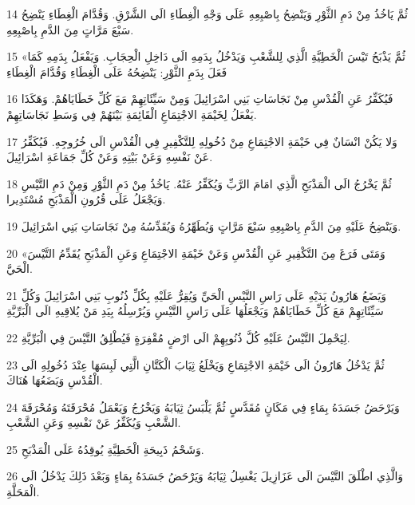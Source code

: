 \par 14 ثُمَّ يَاخُذُ مِنْ دَمِ الثَّوْرِ وَيَنْضِحُ بِاصْبِعِهِ عَلَى وَجْهِ الْغِطَاءِ الَى الشَّرْقِ. وَقُدَّامَ الْغِطَاءِ يَنْضِحُ سَبْعَ مَرَّاتٍ مِنَ الدَّمِ بِاصْبِعِهِ.
\par 15 «ثُمَّ يَذْبَحُ تَيْسَ الْخَطِيَّةِ الَّذِي لِلشَّعْبِ وَيَدْخُلُ بِدَمِهِ الَى دَاخِلِ الْحِجَابِ. وَيَفْعَلُ بِدَمِهِ كَمَا فَعَلَ بِدَمِ الثَّوْرِ: يَنْضِحُهُ عَلَى الْغِطَاءِ وَقُدَّامَ الْغِطَاءِ
\par 16 فَيُكَفِّرُ عَنِ الْقُدْسِ مِنْ نَجَاسَاتِ بَنِي اسْرَائِيلَ وَمِنْ سَيِّئَاتِهِمْ مَعَ كُلِّ خَطَايَاهُمْ. وَهَكَذَا يَفْعَلُ لِخَيْمَةِ الاجْتِمَاعِ الْقَائِمَةِ بَيْنَهُمْ فِي وَسَطِ نَجَاسَاتِهِمْ.
\par 17 وَلا يَكُنْ انْسَانٌ فِي خَيْمَةِ الاجْتِمَاعِ مِنْ دُخُولِهِ لِلتَّكْفِيرِ فِي الْقُدْسِ الَى خُرُوجِهِ. فَيُكَفِّرُ عَنْ نَفْسِهِ وَعَنْ بَيْتِهِ وَعَنْ كُلِّ جَمَاعَةِ اسْرَائِيلَ.
\par 18 ثُمَّ يَخْرُجُ الَى الْمَذْبَحِ الَّذِي امَامَ الرَّبِّ وَيُكَفِّرُ عَنْهُ. يَاخُذُ مِنْ دَمِ الثَّوْرِ وَمِنْ دَمِ التَّيْسِ وَيَجْعَلُ عَلَى قُرُونِ الْمَذْبَحِ مُسْتَدِيرا.
\par 19 وَيَنْضِحُ عَلَيْهِ مِنَ الدَّمِ بِاصْبِعِهِ سَبْعَ مَرَّاتٍ وَيُطَهِّرُهُ وَيُقَدِّسُهُ مِنْ نَجَاسَاتِ بَنِي اسْرَائِيلَ.
\par 20 «وَمَتَى فَرَغَ مِنَ التَّكْفِيرِ عَنِ الْقُدْسِ وَعَنْ خَيْمَةِ الاجْتِمَاعِ وَعَنِ الْمَذْبَحِ يُقَدِّمُ التَّيْسَ الْحَيَّ.
\par 21 وَيَضَعُ هَارُونُ يَدَيْهِ عَلَى رَاسِ التَّيْسِ الْحَيِّ وَيُقِرُّ عَلَيْهِ بِكُلِّ ذُنُوبِ بَنِي اسْرَائِيلَ وَكُلِّ سَيِّئَاتِهِمْ مَعَ كُلِّ خَطَايَاهُمْ وَيَجْعَلُهَا عَلَى رَاسِ التَّيْسِ وَيُرْسِلُهُ بِيَدِ مَنْ يُلاقِيهِ الَى الْبَرِّيَّةِ
\par 22 لِيَحْمِلَ التَّيْسُ عَلَيْهِ كُلَّ ذُنُوبِهِمْ الَى ارْضٍ مُقْفِرَةٍ فَيُطْلِقُ التَّيْسَ فِي الْبَرِّيَّةِ.
\par 23 ثُمَّ يَدْخُلُ هَارُونُ الَى خَيْمَةِ الاجْتِمَاعِ وَيَخْلَعُ ثِيَابَ الْكَتَّانِ الَّتِي لَبِسَهَا عِنْدَ دُخُولِهِ الَى الْقُدْسِ وَيَضَعُهَا هُنَاكَ.
\par 24 وَيَرْحَضُ جَسَدَهُ بِمَاءٍ فِي مَكَانٍ مُقَدَّسٍ ثُمَّ يَلْبَسُ ثِيَابَهُ وَيَخْرُجُ وَيَعْمَلُ مُحْرَقَتَهُ وَمُحْرَقَةَ الشَّعْبِ وَيُكَفِّرُ عَنْ نَفْسِهِ وَعَنِ الشَّعْبِ.
\par 25 وَشَحْمُ ذَبِيحَةِ الْخَطِيَّةِ يُوقِدُهُ عَلَى الْمَذْبَحِ.
\par 26 وَالَّذِي اطْلَقَ التَّيْسَ الَى عَزَازِيلَ يَغْسِلُ ثِيَابَهُ وَيَرْحَضُ جَسَدَهُ بِمَاءٍ وَبَعْدَ ذَلِكَ يَدْخُلُ الَى الْمَحَلَّةِ.

